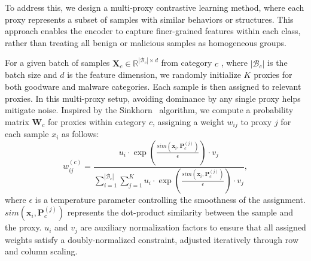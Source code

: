 To address this, we design a multi-proxy contrastive learning method, where each proxy represents a subset of samples with similar behaviors or structures. This approach enables the encoder to capture finer-grained features within each class, rather than treating all benign or malicious samples as homogeneous groups.




For a given batch of samples $\mathbf{X}_c \in \mathbb{R}^{|\mathcal{B}_c| \times d}$ from category $c$ , where $|\mathcal{B}_c|$ is the batch size and $d$ is the feature dimension, we randomly initialize $K$ proxies for both goodware and malware categories. Each sample is then assigned to relevant proxies. In this multi-proxy setup, avoiding dominance by any single proxy helps mitigate noise. Inspired by the Sinkhorn~\cite{sinkhorn} algorithm, we compute a probability matrix $\mathbf{W}_c$ for proxies within category $c$, assigning a weight $w_{ij}$ to proxy $j$ for each sample $x_i$ as follows:
\begin{equation}
w_{i j}^{(c)}=\frac{u_i \cdot \exp \left(\frac{sim(\mathbf{x}_i, \mathbf{P}_c^{(j)})}{\epsilon}\right) \cdot v_j}{\sum_{i=1}^{|\mathcal{B}_c|} \sum_{j=1}^K u_i \cdot \exp \left(\frac{sim(\mathbf{x}_i, \mathbf{P}_c^{(j)})}{\epsilon}\right) \cdot v_j},
\end{equation}
where $\epsilon$ is a temperature parameter controlling the smoothness of the assignment. $sim(\mathbf{x}_i, \mathbf{P}_c^{(j)})$ represents the dot-product similarity between the sample and the proxy. $u_i$ and $v_j$ are auxiliary normalization factors to ensure that all assigned weights satisfy a doubly-normalized constraint, adjusted iteratively through row and column scaling.

